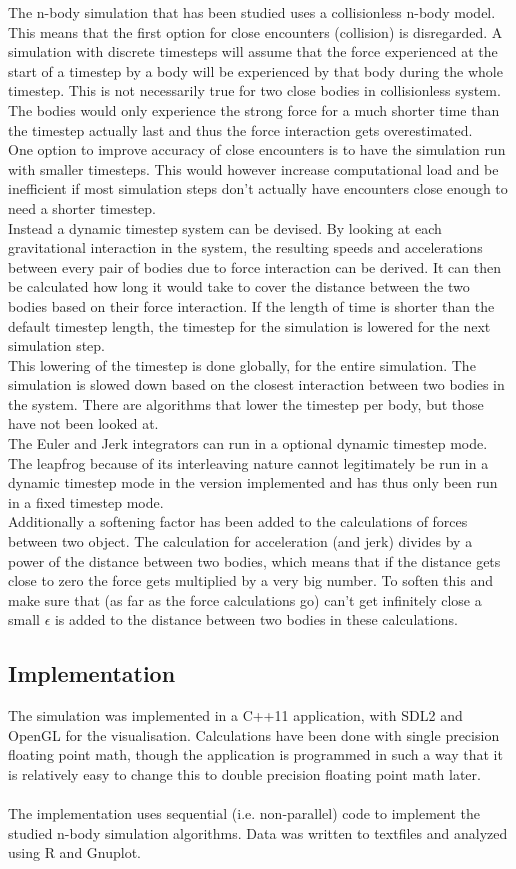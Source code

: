 \documentclass[11pt]{article} %
\begin{document}
The n-body simulation that has been studied uses a collisionless n-body model. This means that the first option for close encounters (collision) is disregarded. A simulation with discrete timesteps will assume that the force experienced at the start of a timestep by a body will be experienced by that body during the whole timestep. This is not necessarily true for two close bodies in collisionless system. The bodies would only experience the strong force for a much shorter time than the timestep actually last and thus the force interaction gets overestimated. \\
One option to improve accuracy of close encounters is to have the simulation run with smaller timesteps. This would however increase computational load and be inefficient if most simulation steps don't actually have encounters close enough to need a shorter timestep.\\
Instead a dynamic timestep system can be devised. By looking at each gravitational interaction in the system, the resulting speeds and accelerations between every pair of bodies due to force interaction can be derived. It can then be calculated how long it would take to cover the distance between the two bodies based on their force interaction. If the length of time is shorter than the default timestep length, the timestep for the simulation is lowered for the next simulation step.\\ 
This lowering of the timestep is done globally, for the entire simulation. The simulation is slowed down based on the closest interaction between two bodies in the system. There are algorithms that lower the timestep per body, but those have not been looked at.\\
The Euler and Jerk integrators can run in a optional dynamic timestep mode. The leapfrog because of its interleaving nature cannot legitimately be run in a dynamic timestep mode in the version implemented and has thus only been run in a fixed timestep mode.\\
Additionally a softening factor has been added to the calculations of forces between two object. The calculation for acceleration (and jerk) divides by a power of the distance between two bodies, which means that if the distance gets close to zero the force gets multiplied by a very big number. To soften this and make sure that (as far as the force calculations go) can't get infinitely close a small $\epsilon$ is added to the distance between two bodies in these calculations.
\subsection{Implementation}
The simulation was implemented in a C++11 application, with SDL2 and OpenGL for the visualisation. Calculations have been done with single precision floating point math, though the application is programmed in such a way that it is relatively easy to change this to double precision floating point math later. \\\\
The implementation uses sequential (i.e. non-parallel) code to implement the studied n-body simulation algorithms. Data was written to textfiles and analyzed using R and Gnuplot.
\end{document}
